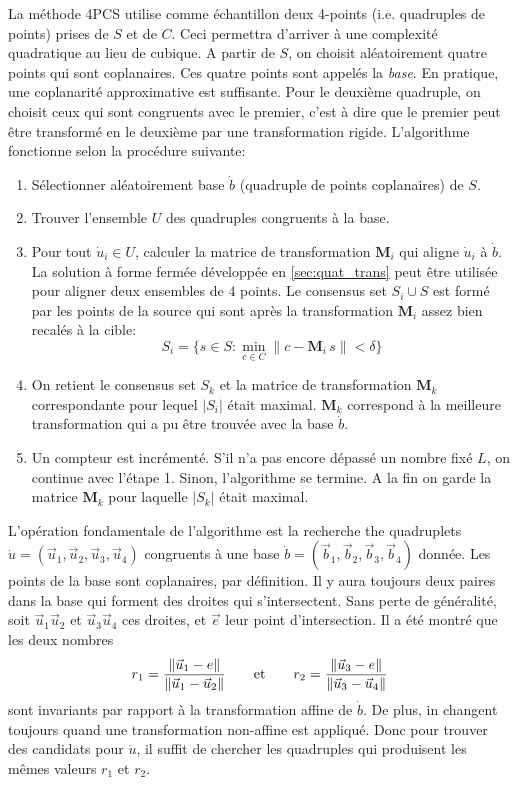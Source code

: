 \documentclass[a4paper,10pt]{scrreprt}
\begin{document}
La méthode 4PCS utilise comme échantillon deux 4-points (i.e. quadruples de points) prises de $S$ et de $C$. Ceci permettra d'arriver à une complexité quadratique au lieu de cubique. A partir de $S$, on choisit aléatoirement quatre points qui sont coplanaires. Ces quatre points sont appelés la \emph{base}. En pratique, une coplanarité approximative est suffisante. Pour le deuxième quadruple, on choisit ceux qui sont congruents avec le premier, c'est à dire que le premier peut être transformé en le deuxième par une transformation rigide. L'algorithme fonctionne selon la procédure suivante:
\begin{enumerate}
	\item Sélectionner aléatoirement base $\dot{b}$ (quadruple de points coplanaires) de $S$.
	\item Trouver l'ensemble $U$ des quadruples congruents à la base.
	\item Pour tout $\dot{u}_i \in U$, calculer la matrice de transformation $\mathbf{M}_i$ qui aligne $\dot{u}_i$ à $\dot{b}$. La solution à forme fermée développée en \ref{sec:quat_trans} peut être utilisée pour aligner deux ensembles de $4$ points. Le consensus set $S_i \cup S$ est formé par les points de la source qui sont après la transformation $\mathbf{M}_i$ assez bien recalés à la cible:
		\begin{equation}
			S_i = \{ s \in S : \min_{c \in C} \| c - \mathbf{M}_i \, s \| < \delta \}
		\end{equation}
	\item On retient le consensus set $S_k$ et la matrice de transformation $\mathbf{M}_k$ correspondante pour lequel $|S_i|$ était maximal. $\mathbf{M}_k$ correspond à la meilleure transformation qui a pu être trouvée avec la base $\dot{b}$.
	\item Un compteur est incrémenté. S'il n'a pas encore dépassé un nombre fixé $L$, on continue avec l'étape 1. Sinon, l'algorithme se termine. A la fin on garde la matrice $\mathbf{M}_k$ pour laquelle $|S_k|$ était maximal.
\end{enumerate}

L'opération fondamentale de l'algorithme est la recherche the quadruplets $\dot{u} = (\vec{u}_1, \vec{u}_2, \vec{u}_3, \vec{u}_4)$ congruents à une base $\dot{b} = (\vec{b}_1, \vec{b}_2, \vec{b}_3, \vec{b}_4)$ donnée. Les points de la base sont coplanaires, par définition. Il y aura toujours deux paires dans la base qui forment des droites qui s'intersectent. Sans perte de généralité, soit $\vec{u}_1 \vec{u}_2$ et $\vec{u}_3 \vec{u}_4$ ces droites, et $\vec{e}$ leur point d'intersection. Il a été montré que les deux nombres
\begin{equation}
	r_1 = \frac{\| \vec{u}_1 - e \|}{\| \vec{u}_1 - \vec{u}_2 \|}
	\hspace{7mm} \text{et} \hspace{7mm}
	r_2 = \frac{\| \vec{u}_3 - e \|}{\| \vec{u}_3 - \vec{u}_4 \|}
\end{equation}
sont invariants par rapport à la transformation affine de $\dot{b}$. De plus, in changent toujours quand une transformation non-affine est appliqué. Donc pour trouver des candidats pour $\dot{u}$, il suffit de chercher les quadruples qui produisent les mêmes valeurs $r_1$ et $r_2$.
\end{document}
